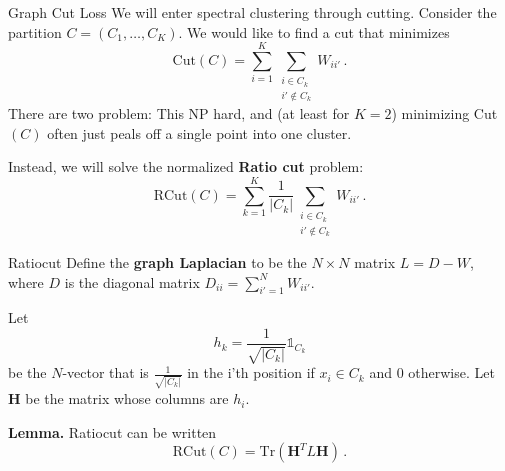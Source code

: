 \documentclass[10pt, table, dvipsnames,xcdraw,handout]{beamer}
\begin{document}
\begin{frame}[fragile]{Graph Cut Loss}
We will enter spectral clustering through cutting. Consider the partition $C = (C_1,\ldots, C_K)$. We would like to find a cut that minimizes
$$
\text{Cut}(C) = \sum_{i=1}^K \sum_{\substack{i\in C_k \\ i'\not\in C_k}} W_{ii'}\,.
$$\pause
There are two problem: This NP hard, and (at least for $K=2$) minimizing Cut$(C)$ often just peals off a single point into one cluster. \pause 

Instead, we will solve the normalized \textbf{Ratio cut} problem:
$$
\text{RCut}(C) = \sum_{k=1}^K  \frac{1}{|C_k|} \sum_{\substack{i\in C_k \\ i'\not\in C_k}} W_{ii'}\,.
$$
\end{frame}




\begin{frame}[fragile]{Ratiocut}
Define the \textbf{graph Laplacian} to be the $N\times N$ matrix $L = D-W$, where $D$ is the diagonal matrix $D_{ii} = \sum_{i'=1}^N W_{ii'}$. \pause 

Let 
$$
h_k  = \frac{1}{\sqrt{|C_k|}} \mathds{1}_{C_k}
$$ 
be the $N$-vector that is $ \frac{1}{\sqrt{|C_k|}} $ in the i'th position if $x_i\in C_k$ and $0$ otherwise. \pause Let $\mathbf{H}$ be the matrix whose columns are $h_i$. \pause

\textbf{Lemma.} Ratiocut can be written
$$
\text{RCut}(C)  = \text{Tr}(\mathbf{H}^TL\mathbf{H})\,.
$$
\end{frame}
\end{document}
